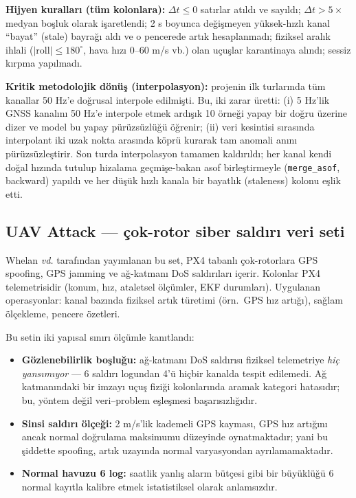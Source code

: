 \documentclass[11pt,a4paper]{article}
\newcommand{\etal}{\emph{vd.}}
\begin{document}
\textbf{Hijyen kuralları (tüm kolonlara):} $\Delta t \leq 0$ satırlar atıldı ve
sayıldı; $\Delta t > 5\times$medyan boşluk olarak işaretlendi; 2 s boyunca
değişmeyen yüksek-hızlı kanal ``bayat'' (stale) bayrağı aldı ve o pencerede
artık hesaplanmadı; fiziksel aralık ihlali ($|\text{roll}| \leq 180^\circ$,
hava hızı 0--60 m/s vb.) olan uçuşlar karantinaya alındı; sessiz kırpma
yapılmadı.

\textbf{Kritik metodolojik dönüş (interpolasyon):} projenin ilk turlarında tüm
kanallar 50 Hz'e doğrusal interpole edilmişti. Bu, iki zarar üretti: (i) 5 Hz'lik
GNSS kanalını 50 Hz'e interpole etmek ardışık 10 örneği yapay bir doğru üzerine
dizer ve model bu yapay pürüzsüzlüğü öğrenir; (ii) veri kesintisi sırasında
interpolant iki uzak nokta arasında köprü kurarak tam anomali anını
pürüzsüzleştirir. Son turda interpolasyon tamamen kaldırıldı; her kanal kendi
doğal hızında tutulup hizalama geçmişe-bakan asof birleştirmeyle
(\texttt{merge\_asof}, backward) yapıldı ve her düşük hızlı kanala bir bayatlık
(staleness) kolonu eşlik etti.

\subsection{UAV Attack --- çok-rotor siber saldırı veri seti}

Whelan \etal{} \cite{whelan2020uav} tarafından yayımlanan bu set, PX4 tabanlı
çok-rotorlara GPS spoofing, GPS jamming ve ağ-katmanı DoS saldırıları içerir.
Kolonlar PX4 telemetrisidir (konum, hız, ataletsel ölçümler, EKF durumları).
Uygulanan operasyonlar: kanal bazında fiziksel artık türetimi (örn.\ GPS hız
artığı), sağlam ölçekleme, pencere özetleri.

Bu setin iki yapısal sınırı ölçümle kanıtlandı:

\begin{itemize}[itemsep=2pt]
  \item \textbf{Gözlenebilirlik boşluğu:} ağ-katmanı DoS saldırısı fiziksel
        telemetriye \emph{hiç yansımıyor} --- 6 saldırı logundan 4'ü hiçbir
        kanalda tespit edilemedi. Ağ katmanındaki bir imzayı uçuş fiziği
        kolonlarında aramak kategori hatasıdır; bu, yöntem değil veri--problem
        eşleşmesi başarısızlığıdır.
  \item \textbf{Sinsi saldırı ölçeği:} 2 m/s'lik kademeli GPS kayması, GPS hız
        artığını ancak normal doğrulama maksimumu düzeyinde oynatmaktadır;
        yani bu şiddette spoofing, artık uzayında normal varyasyondan
        ayrılamamaktadır.
  \item \textbf{Normal havuzu 6 log:} saatlik yanlış alarm bütçesi gibi bir
        büyüklüğü 6 normal kayıtla kalibre etmek istatistiksel olarak
        anlamsızdır.
\end{itemize}
\end{document}
